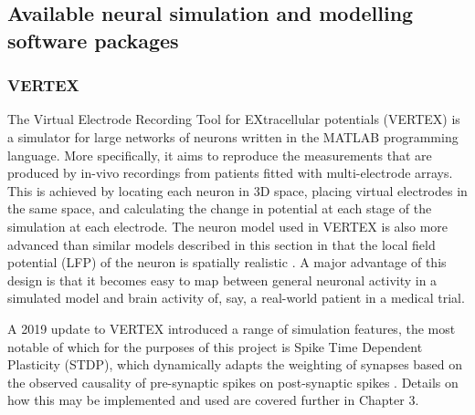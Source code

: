 \autocite{brette_simulation_2007}


\subsection{Available neural simulation and modelling software packages}

\subsubsection{VERTEX}
The Virtual Electrode Recording Tool for EXtracellular potentials (VERTEX) is a
simulator for large networks of neurons written in the MATLAB programming
language. More specifically, it aims to reproduce the measurements that are
produced by in-vivo recordings from patients fitted with multi-electrode
arrays. This is achieved by locating each neuron in 3D space, placing virtual
electrodes in the same space, and calculating the change in potential at each
stage of the simulation at each electrode. The neuron model used in VERTEX is
also more advanced than similar models described in this section in that the
local field potential (LFP) of the neuron is spatially realistic
\autocite{tomsett_virtual_2015}. A major advantage of this design is that it
becomes easy to map between general neuronal activity in a simulated model and
brain activity of, say, a real-world patient in a medical trial.

A 2019 update to VERTEX introduced a range of simulation features, the most
notable of which for the purposes of this project is Spike Time Dependent
Plasticity (STDP), which dynamically adapts the weighting of synapses based on
the observed causality of pre-synaptic spikes on post-synaptic spikes
\autocite{thornton_virtual_2019}. Details on how this may be implemented and
used are covered further in Chapter 3.

